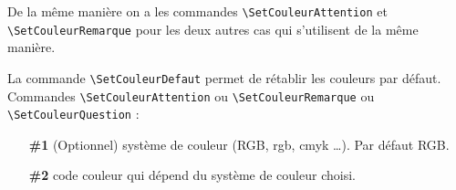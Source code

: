 \documentclass[12pt]{article}
\begin{document}
De la même manière on a les commandes \verb!\SetCouleurAttention! et
\verb!\SetCouleurRemarque! pour les deux autres cas qui s'utilisent de la même manière.

La commande \verb!\SetCouleurDefaut! permet de rétablir les couleurs par défaut. \\

Commandes \verb!\SetCouleurAttention! ou \verb!\SetCouleurRemarque! ou
\verb!\SetCouleurQuestion! :
\begin{itemize}
    \item[\hspace{2ex}\bfseries\#1] (Optionnel) système de couleur (RGB, rgb, cmyk
        \ldots). Par défaut RGB.
    \item[\hspace{2ex}\bfseries\#2] code couleur qui dépend du système de couleur choisi. \\
\end{itemize}
\end{document}
